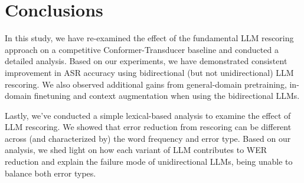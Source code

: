 \documentclass[a4paper]{article}
\begin{document}

\section{Conclusions}

In this study, we have re-examined the effect of the fundamental LLM rescoring approach \cite{shin2019effective,salazar-etal-2020-masked} on a competitive Conformer-Transducer baseline and conducted a detailed analysis.
Based on our experiments, we have demonstrated consistent improvement in ASR accuracy using bidirectional (but not unidirectional) LLM rescoring. We also observed additional gains from general-domain pretraining, in-domain finetuning and context augmentation when using the bidirectional LLMs.

Lastly, we've conducted a simple lexical-based analysis to examine the effect of LLM rescoring. We showed that error reduction from rescoring can be different across (and characterized by) the word frequency and error type. 
Based on our analysis, we shed light on how each variant of LLM contributes to WER reduction and explain the failure mode of unidirectional LLMs, being unable to balance both error types.

\newpage





\end{document}
